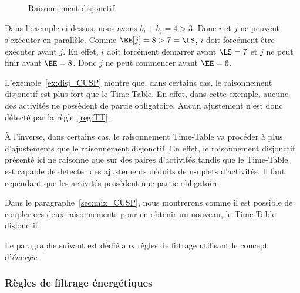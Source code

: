 \begin{ex}
\begin{figure}[htb!]
  \caption{Raisonnement disjonctif}
  \label{fig:disj_CUSP}
\end{figure}
Dans l'exemple ci-dessus, nous avons $b_i+b_j=4 > 3$. Donc $i$ et $j$
ne peuvent s'exécuter en parallèle. Comme $\EE[j] = 8 > 7=\LS$, $i$
doit forcément être exécuter avant $j$. En effet, $i$ doit forcément
démarrer avant $\LS=7$ et $j$ ne peut finir avant $\EE=8$. Donc $j$ ne
peut commencer avant $\EE=6$.
\end{ex}

L'exemple~\ref{ex:disj_CUSP} montre que, dans certains cas, le
raisonnement disjonctif est plus fort que le Time-Table. En effet,
dans cette exemple, aucune des activités ne possèdent de partie
obligatoire. Aucun ajustement n'est donc détecté par la
règle~\ref{reg:TT}. 

{\`A} l'inverse, dans certains cas, le raisonnement Time-Table va
procéder à plus d'ajustements que le raisonnement disjonctif. En
effet, le raisonnement disjonctif présenté ici ne raisonne que sur des
paires d'activités tandis que le Time-Table est capable de détecter
des ajustements déduits de n-uplets d'activités. Il faut cependant que
les activités possèdent une partie obligatoire.

Dans le paragraphe~\ref{sec:mix_CUSP}, nous montrerons comme il est
possible de coupler ces deux raisonnements pour en obtenir un nouveau,
le Time-Table disjonctif. 

Le paragraphe suivant est dédié aux règles de filtrage utilisant le
concept d'{\it énergie}. 
 
\subsubsection{Règles de filtrage énergétiques}
 
